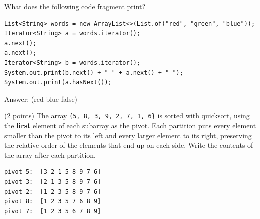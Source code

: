 \begin{question}
What does the following code fragment print?

\begin{lstlisting}
List<String> words = new ArrayList<>(List.of("red", "green", "blue"));
Iterator<String> a = words.iterator();
a.next();
a.next();
Iterator<String> b = words.iterator();
System.out.print(b.next() + " " + a.next() + " ");
System.out.print(a.hasNext());
\end{lstlisting}

Answer: \underline{\hspace{1.5in}} \ifanswers (red blue false)\fi
\end{question}

\begin{question}
(2 points) The array \lstinline|{5, 8, 3, 9, 2, 7, 1, 6}| is sorted with quicksort, using the \textbf{first} element of each subarray as the pivot.
Each partition puts every element smaller than the pivot to its left and every larger element to its right, preserving the relative order of the elements that end up on each side.
Write the contents of the array after each partition.

\ifanswers
\begin{verbatim}
pivot 5:  [3 2 1 5 8 9 7 6]
pivot 3:  [2 1 3 5 8 9 7 6]
pivot 2:  [1 2 3 5 8 9 7 6]
pivot 8:  [1 2 3 5 7 6 8 9]
pivot 7:  [1 2 3 5 6 7 8 9]
\end{verbatim}
\else
\vspace{3in}
\fi
\end{question}
